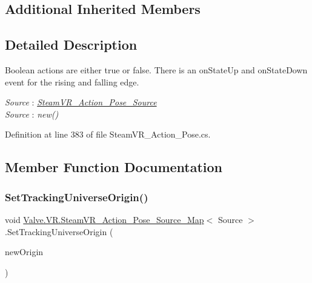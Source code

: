 \subsection*{Additional Inherited Members}


\subsection{Detailed Description}
Boolean actions are either true or false. There is an on\+State\+Up and on\+State\+Down event for the rising and falling edge. 

\begin{Desc}
\item[Type Constraints]\begin{description}
\item[{\em Source} : {\em \mbox{\hyperlink{class_valve_1_1_v_r_1_1_steam_v_r___action___pose___source}{Steam\+V\+R\+\_\+\+Action\+\_\+\+Pose\+\_\+\+Source}}}]\item[{\em Source} : {\em new()}]\end{description}
\end{Desc}


Definition at line 383 of file Steam\+V\+R\+\_\+\+Action\+\_\+\+Pose.\+cs.



\subsection{Member Function Documentation}
\mbox{\label{class_valve_1_1_v_r_1_1_steam_v_r___action___pose___source___map_ae4ca8d0ab32ff169f5f7d3825a024082}} 
\subsubsection{\texorpdfstring{SetTrackingUniverseOrigin()}{SetTrackingUniverseOrigin()}}
{\footnotesize\ttfamily void \mbox{\hyperlink{class_valve_1_1_v_r_1_1_steam_v_r___action___pose___source___map}{Valve.\+V\+R.\+Steam\+V\+R\+\_\+\+Action\+\_\+\+Pose\+\_\+\+Source\+\_\+\+Map}}$<$ Source $>$.Set\+Tracking\+Universe\+Origin (\begin{DoxyParamCaption}\item[{\mbox{\hyperlink{namespace_valve_1_1_v_r_a29be99a3c2f780157bd490db06a7f12f}{E\+Tracking\+Universe\+Origin}}}]{new\+Origin }\end{DoxyParamCaption})}



